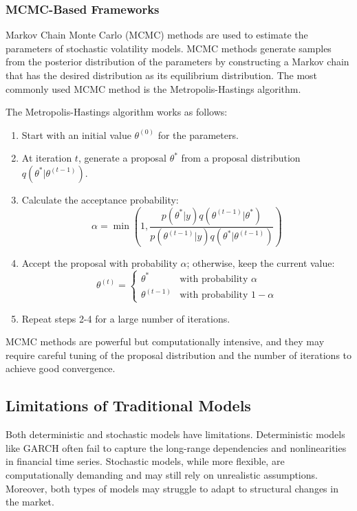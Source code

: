 \documentclass[letterpaper, 11pt]{article}
\begin{document}
\subsubsection{MCMC-Based Frameworks}
Markov Chain Monte Carlo (MCMC) methods are used to estimate the parameters of stochastic volatility models. MCMC methods generate samples from the posterior distribution of the parameters by constructing a Markov chain that has the desired distribution as its equilibrium distribution. The most commonly used MCMC method is the Metropolis-Hastings algorithm.

The Metropolis-Hastings algorithm works as follows:
\begin{enumerate}
    \item Start with an initial value \( \theta^{(0)} \) for the parameters.
    \item At iteration \( t \), generate a proposal \( \theta^* \) from a proposal distribution \( q(\theta^*|\theta^{(t-1)}) \).
    \item Calculate the acceptance probability:
    \begin{equation}
    \alpha = \min \left( 1, \frac{p(\theta^*|y) q(\theta^{(t-1)}|\theta^*)}{p(\theta^{(t-1)}|y) q(\theta^*|\theta^{(t-1)})} \right)
    \end{equation}
    \item Accept the proposal with probability \( \alpha \); otherwise, keep the current value:
    \begin{equation}
    \theta^{(t)} = \begin{cases}
    \theta^* & \text{with probability } \alpha \\
    \theta^{(t-1)} & \text{with probability } 1-\alpha
    \end{cases}
    \end{equation}
    \item Repeat steps 2-4 for a large number of iterations.
\end{enumerate}

MCMC methods are powerful but computationally intensive, and they may require careful tuning of the proposal distribution and the number of iterations to achieve good convergence.

\subsection{Limitations of Traditional Models}
Both deterministic and stochastic models have limitations. Deterministic models like GARCH often fail to capture the long-range dependencies and nonlinearities in financial time series. Stochastic models, while more flexible, are computationally demanding and may still rely on unrealistic assumptions. Moreover, both types of models may struggle to adapt to structural changes in the market.
\end{document}
